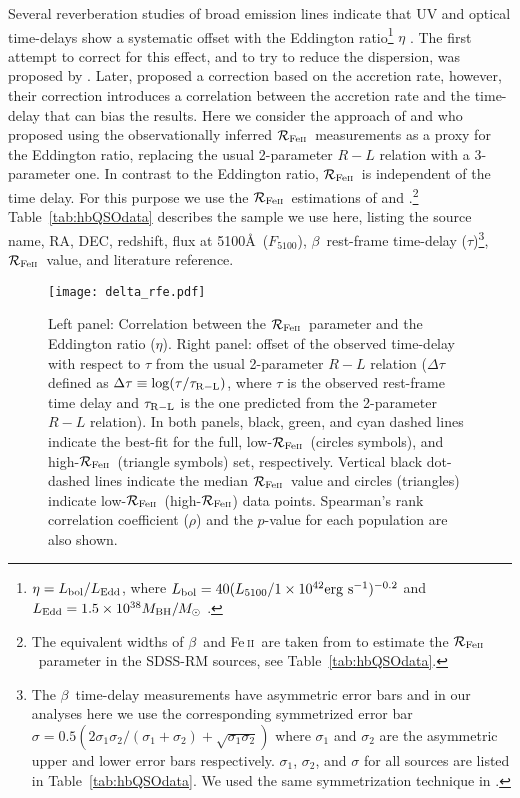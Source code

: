 \documentclass[a4paper,fleqn,usenatbib]{mnras}
\newcommand{\rfe}{${\cal R}_{\rm{Fe\textsc{ii}}}$}
\newcommand{\Feii}{Fe\,\textsc{ii}}
\newcommand{\hb}{{\sc{H}}$\beta$\/}
\begin{document}
Several reverberation studies of broad emission lines indicate that UV and optical time-delays show a systematic offset with the Eddington ratio\footnote{$\eta=L_{\rm bol}/ L_{\rm Edd}$, where $L_{\rm bol}=40(L_{5100}/1\times10^{42} {\rm erg~ s}^{-1})^{-0.2}$  and $L_{\rm Edd}=1.5\times10^{38}M_{\rm BH}/M_{\odot}$ \citep{netzer2019}.} $\eta$ \citep{du2015, duwang_2019,Mary2020}. The  first attempt to correct for this effect, and to try to reduce the dispersion, was proposed by \citet{du2016}. Later, \citet{Mary2019} proposed a correction based on the accretion rate, however, their correction introduces a correlation between the accretion rate and the time-delay that can bias the results. Here we consider the approach of \citet{duwang_2019} and \citet{Yu2020} who proposed using the observationally inferred \rfe\ measurements as a proxy for the Eddington ratio, replacing the usual 2-parameter $R-L$ relation with a 3-parameter one. In contrast to the Eddington ratio, \rfe\ is independent of the time delay. For this purpose we use the \rfe\ estimations of \citet{duwang_2019} and \citet{shen_2019}.\footnote{The equivalent widths of \hb\ and \Feii\ are taken from \citet{shen_2019} to estimate the \rfe\ parameter in the SDSS-RM sources, see Table~\ref{tab:hbQSOdata}.} Table~\ref{tab:hbQSOdata} describes the sample we use here, listing the source name, RA, DEC, redshift, flux at 5100\AA\ ($F_{5100}$), \hb\ rest-frame time-delay ($\tau$)\footnote{The \hb\ time-delay measurements have asymmetric error bars and in our analyses here we use the corresponding symmetrized error bar $\sigma = 0.5(2\sigma_1 \sigma_2/(\sigma_1 + \sigma_2) + \sqrt{\sigma_1\sigma_2})$ \citep{Barlow2004} where $\sigma_1$ and $\sigma_2$ are the asymmetric upper and lower error bars respectively. $\sigma_1$, $\sigma_2$, and $\sigma$ for all sources are listed in Table~\ref{tab:hbQSOdata}. We used the same symmetrization technique in \cite{khadka2021}.},  \rfe\ value, and literature reference. 

\begin{figure*}
 \texttt{[image: delta\_rfe.pdf]}
\caption{Left panel: Correlation between the \rfe\ parameter and the Eddington ratio ($\eta$).  Right panel: offset of the observed time-delay with respect to $\tau$ from the usual 2-parameter $R-L$ relation ($\Delta \tau$ defined as $\Delta \tau\equiv \log(\tau/\tau_{\rm R-L})$, where $\tau$ is the observed rest-frame time delay and $\tau_{\rm R-L}$ is the one predicted from the 2-parameter $R-L$ relation). In both panels, black, green, and cyan dashed lines indicate the best-fit for the full, low-\rfe\ (circles symbols), and high-\rfe\ (triangle symbols) set, respectively. Vertical black dot-dashed lines indicate the median \rfe\ value and circles (triangles) indicate low-\rfe\ (high-\rfe) data points. Spearman's rank correlation coefficient ($\rho$) and the $p$-value for each population are also shown.}
\label{fig:delta_rfe}
\end{figure*}
\end{document}
